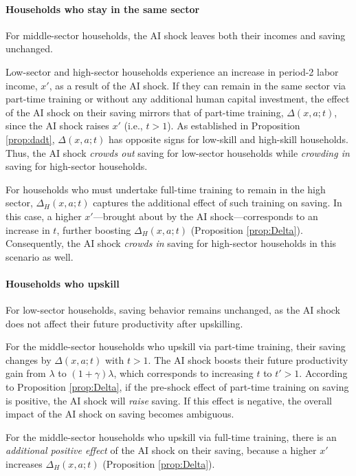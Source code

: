 \documentclass[12pt]{article}
\begin{document}
\paragraph{Households who stay in the same sector}
For middle-sector households, the AI shock leaves both their incomes and saving unchanged.

Low-sector and high-sector households experience an increase in period-2 labor income, $x'$, as a result of the AI shock. If they can remain in the same sector via part-time training or without any additional human capital investment, the effect of the AI shock on their saving mirrors that of part-time training, $\Delta(x,a;t)$, since the AI shock raises $x'$ (i.e., $t>1$). As established in Proposition \ref{prop:dadt}, $\Delta(x,a;t)$ has opposite signs for low-skill and high-skill households. Thus, the AI shock \textit{crowds out} saving for low-sector households while \textit{crowding in} saving for high-sector households.

For households who must undertake full-time training to remain in the high sector, $\Delta_{H}(x,a;t)$ captures the additional effect of such training on saving. In this case, a higher $x'$—brought about by the AI shock—corresponds to an increase in $t$, further boosting $\Delta_{H}(x,a;t)$ (Proposition \ref{prop:Delta}). Consequently, the AI shock \textit{crowds in} saving for high-sector households in this scenario as well.


\paragraph{Households who upskill} For low-sector households, saving behavior remains unchanged, as the AI shock does not affect their future productivity after upskilling.

For the middle-sector households who upskill via part-time training, their saving changes by $\Delta(x,a;t)$ with $t>1$. The AI shock boosts their future productivity gain from $\lambda$ to $(1+\gamma)\lambda$, which corresponds to increasing $t$ to $t'>1$. According to Proposition \ref{prop:Delta}, if the pre-shock effect of part-time training on saving is positive, the AI shock will \textit{raise} saving. If this effect is negative, the overall impact of the AI shock on saving becomes ambiguous.

For the middle-sector households who upskill via full-time training, there is an \textit{additional positive effect} of the AI shock on their saving, because a higher $x'$ increases $\Delta_{H}(x,a;t)$ (Proposition \ref{prop:Delta}).
\end{document}
